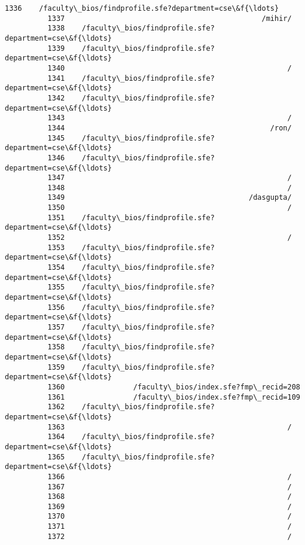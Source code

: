\documentclass[11pt]{article}
\begin{document}
\begin{Verbatim}[commandchars=\\\{\}]
          1336    /faculty\_bios/findprofile.sfe?department=cse\&f{\ldots}
          1337                                              /mihir/
          1338    /faculty\_bios/findprofile.sfe?department=cse\&f{\ldots}
          1339    /faculty\_bios/findprofile.sfe?department=cse\&f{\ldots}
          1340                                                    /
          1341    /faculty\_bios/findprofile.sfe?department=cse\&f{\ldots}
          1342    /faculty\_bios/findprofile.sfe?department=cse\&f{\ldots}
          1343                                                    /
          1344                                                /ron/
          1345    /faculty\_bios/findprofile.sfe?department=cse\&f{\ldots}
          1346    /faculty\_bios/findprofile.sfe?department=cse\&f{\ldots}
          1347                                                    /
          1348                                                    /
          1349                                           /dasgupta/
          1350                                                    /
          1351    /faculty\_bios/findprofile.sfe?department=cse\&f{\ldots}
          1352                                                    /
          1353    /faculty\_bios/findprofile.sfe?department=cse\&f{\ldots}
          1354    /faculty\_bios/findprofile.sfe?department=cse\&f{\ldots}
          1355    /faculty\_bios/findprofile.sfe?department=cse\&f{\ldots}
          1356    /faculty\_bios/findprofile.sfe?department=cse\&f{\ldots}
          1357    /faculty\_bios/findprofile.sfe?department=cse\&f{\ldots}
          1358    /faculty\_bios/findprofile.sfe?department=cse\&f{\ldots}
          1359    /faculty\_bios/findprofile.sfe?department=cse\&f{\ldots}
          1360                /faculty\_bios/index.sfe?fmp\_recid=208
          1361                /faculty\_bios/index.sfe?fmp\_recid=109
          1362    /faculty\_bios/findprofile.sfe?department=cse\&f{\ldots}
          1363                                                    /
          1364    /faculty\_bios/findprofile.sfe?department=cse\&f{\ldots}
          1365    /faculty\_bios/findprofile.sfe?department=cse\&f{\ldots}
          1366                                                    /
          1367                                                    /
          1368                                                    /
          1369                                                    /
          1370                                                    /
          1371                                                    /
          1372                                                    /

\end{Verbatim}
\end{document}
